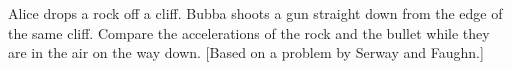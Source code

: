 Alice drops a rock off a cliff. Bubba shoots a gun
straight down from the edge of the same cliff. Compare the
accelerations of the rock and the bullet while they are in the air on
the way down. [Based on a problem by Serway and Faughn.]
